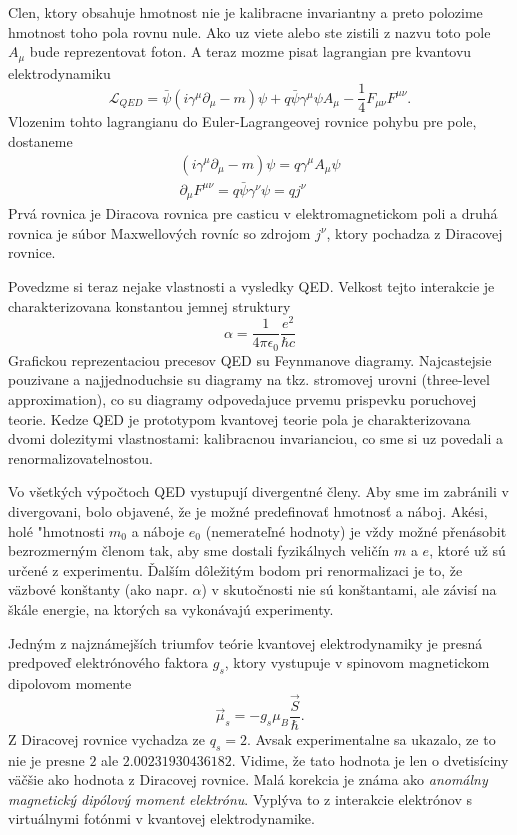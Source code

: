 \documentclass[../../main.tex]{subfiles}
\begin{document}
Clen, ktory obsahuje hmotnost nie je kalibracne invariantny a preto polozime hmotnost toho pola rovnu nule. Ako uz viete alebo ste zistili z nazvu toto pole $A_{\mu}$ bude reprezentovat foton. A teraz mozme pisat lagrangian pre kvantovu elektrodynamiku
\begin{equation}
\mathcal{L}_{QED}=\bar{\psi}(i\gamma^{\mu}\partial_{\mu}-m)\psi+q\bar{\psi}\gamma^{\mu}\psi A_{\mu}-\frac{1}{4}F_{\mu\nu}F^{\mu\nu}.
\end{equation}
Vlozenim tohto lagrangianu do Euler-Lagrangeovej rovnice pohybu pre pole, dostaneme 
\begin{equation}
\begin{gathered}
(i\gamma^{\mu}\partial_{\mu}-m)\psi=q\gamma^{\mu}A_{\mu}\psi\\
\partial_{\mu}F^{\mu\nu}=q\bar{\psi}\gamma^{\nu}\psi=qj^{\nu}
\end{gathered}
\end{equation}
Prvá rovnica je Diracova rovnica pre casticu v elektromagnetickom poli a druhá rovnica je súbor Maxwellových rovníc so zdrojom $j^{\nu}$, ktory pochadza z Diracovej rovnice.\par
Povedzme si teraz nejake vlastnosti a vysledky QED.
Velkost tejto interakcie je charakterizovana konstantou jemnej struktury
\begin{equation}
\alpha=\frac{1}{4\pi \epsilon_0}\frac{e^2}{\hbar c}
\end{equation}
Grafickou reprezentaciou precesov QED su Feynmanove diagramy. Najcastejsie pouzivane a najjednoduchsie su diagramy na tkz. stromovej urovni (three-level approximation), co su diagramy odpovedajuce prvemu prispevku poruchovej teorie. Kedze QED je prototypom kvantovej teorie pola je charakterizovana dvomi dolezitymi vlastnostami: kalibracnou invarianciou, co sme si uz povedali a renormalizovatelnostou.\par
Vo všetkých výpočtoch QED vystupují divergentné členy. Aby sme im zabránili v divergovani, bolo objavené, že je možné predefinovať hmotnosť a náboj. Akési, holé "hmotnosti $m_0$ a náboje $e_0$ (nemerateľné hodnoty) je vždy možné přenásobit bezrozmerným členom tak, aby sme dostali fyzikálnych veličín $m$ a $e$, ktoré už sú určené z experimentu. Ďalším dôležitým bodom pri renormalizaci je to, že väzbové konštanty (ako napr. $\alpha$) v skutočnosti nie sú konštantami, ale závisí na škále energie, na ktorých sa vykonávajú experimenty.\par
Jedným z najznámejších triumfov teórie kvantovej elektrodynamiky je presná predpoveď elektrónového faktora $g_s$, ktory vystupuje v spinovom magnetickom dipolovom momente 
\begin{equation}
\vec{\mu}_s=-g_s\mu_B\frac{\vec{S}}{\hbar}.
\end{equation}
Z Diracovej rovnice vychadza ze $q_s=2$. Avsak experimentalne sa ukazalo, ze to nie je presne $2$ ale $2.00231930436182$. Vidime, že tato hodnota je len o dvetisíciny väčšie ako hodnota z Diracovej rovnice. Malá korekcia je známa ako \textit{anomálny magnetický dipólový moment elektrónu}. Vyplýva to z interakcie elektrónov s virtuálnymi fotónmi v kvantovej elektrodynamike.
\end{document}
